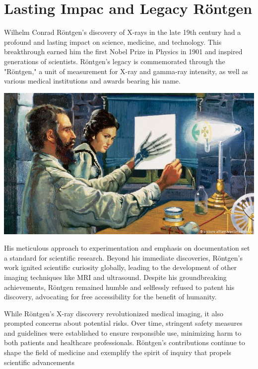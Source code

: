 \documentclass[a4paper,12pt]{report}
\begin{document}
\section{Lasting Impac and Legacy Röntgen}

Wilhelm Conrad Röntgen's discovery of X-rays in the late 19th century had a profound and
lasting impact on science, medicine, and technology. This breakthrough earned him the first
Nobel Prize in Physics in 1901 and inspired generations of scientists. Röntgen's legacy is
commemorated through the "Röntgen," a unit of measurement for X-ray and gamma-ray
intensity, as well as various medical institutions and awards bearing his name.

\begin{center}
  \includegraphics[scale = 0.6]{wr.jpg}
\end{center}


His meticulous approach to experimentation and emphasis on documentation set a standard for
scientific research. Beyond his immediate discoveries, Röntgen's work ignited scientific curiosity
globally, leading to the development of other imaging techniques like MRI and ultrasound.
Despite his groundbreaking achievements, Röntgen remained humble and selflessly refused to
patent his discovery, advocating for free accessibility for the benefit of humanity.

While Röntgen's X-ray discovery revolutionized medical imaging, it also prompted concerns
about potential risks. Over time, stringent safety measures and guidelines were established to
ensure responsible use, minimizing harm to both patients and healthcare professionals. Röntgen's
contributions continue to shape the field of medicine and exemplify the spirit of inquiry that
propels scientific advancements
\end{document}
